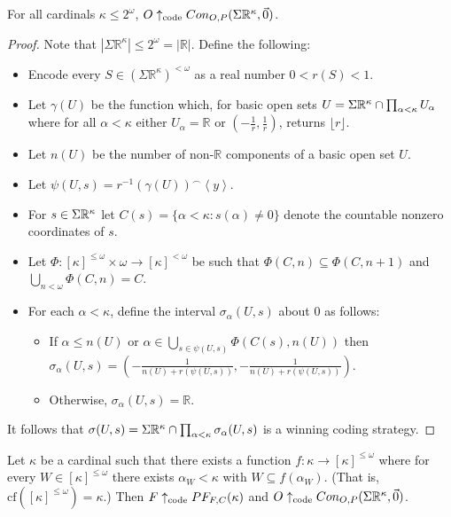 \begin{theorem}
For all cardinals $\kappa\leq 2^\omega$, $O\uparrow_{\text{code}}Con_{O,P}(\Sigma\mathbb{R}^{\kappa},\vec{0})$.
\end{theorem}

\begin{proof}
Note that $|\Sigma\mathbb{R}^\kappa| \leq 2^\omega = |\mathbb{R}|$. Define the following:

    \begin{itemize}
    \item Encode every $S \in (\Sigma\mathbb{R}^{\kappa})^{<\omega}$ as a real number $0<r(S)<1$. 
    \item Let $\gamma(U)$ be the function which, for basic open sets $U=\Sigma\mathbb{R}^{\kappa}\cap\prod_{\alpha<\kappa}U_\alpha$ where for all $\alpha<\kappa$ either $U_\alpha=\mathbb{R}$ or $(-\frac{1}{r},\frac{1}{r})$, returns $\lfloor r \rfloor$.
    \item Let $n(U)$ be the number of non-$\mathbb{R}$ components of a basic open set $U$.
    \item Let $\psi(U,s)=r^{-1}(\gamma(U))^\frown\left<y\right>$.
    \item For $s\in\Sigma\mathbb{R}^{\kappa}$ let $C(s)=\{\alpha<\kappa:s(\alpha)\not=0\}$ denote the countable nonzero coordinates of $s$.
    \item Let $\Phi:[\kappa]^{\leq\omega}\times\omega\to[\kappa]^{<\omega}$ be such that $\Phi(C,n)\subseteq\Phi(C,n+1)$ and $\bigcup_{n<\omega}\Phi(C,n)=C$.
    \item For each $\alpha<\kappa$, define the interval $\sigma_\alpha(U,s)$ about $0$ as follows:
        \begin{itemize}
        \item If $\alpha\leq n(U)$ or $\alpha\in\bigcup_{s\in\psi(U,s)}\Phi(C(s),n(U))$ then $\sigma_\alpha(U,s)=(-\frac{1}{n(U)+r(\psi(U,s))},-\frac{1}{n(U)+r(\psi(U,s))})$.
        \item Otherwise, $\sigma_\alpha(U,s)=\mathbb{R}$.
        \end{itemize}
    \end{itemize}

It follows that $\sigma(U,s)=\Sigma\mathbb{R}^{\kappa}\cap\prod_{\alpha<\kappa} \sigma_\alpha(U,s)$ is a winning coding strategy.
\end{proof}

\begin{theorem}
Let $\kappa$ be a cardinal such that there exists a function $f:\kappa\to[\kappa]^{\leq \omega}$ where for every $W\in[\kappa]^{\leq\omega}$ there exists $\alpha_W<\kappa$ with $W\subseteq f(\alpha_W)$. (That is, $\textrm{cf}([\kappa]^{\leq\omega})=\kappa$.) Then $F \uparrow_{\text{code}} PF_{F,C}(\kappa)$ and $O \uparrow_{\text{code}} Con_{O,P}(\Sigma\mathbb{R}^{\kappa},\vec{0})$.
\end{theorem}

